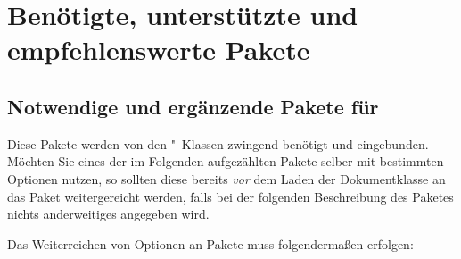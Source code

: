 \chapter{%
  Benötigte, unterstützte und empfehlenswerte Pakete%
  \label{sec:packages}%
}
\section{%
  Notwendige und ergänzende Pakete für \TUDScript%
  \label{sec:packages:needed}%
}

Diese Pakete werden von den \TUDScript"~Klassen zwingend benötigt und 
eingebunden. Möchten Sie eines der im Folgenden aufgezählten Pakete selber 
mit bestimmten Optionen nutzen, so sollten diese bereits \emph{vor} dem Laden 
der Dokumentklasse an das Paket weitergereicht werden, falls bei der folgenden
Beschreibung des Paketes nichts anderweitiges angegeben wird.
%
\begin{Example}
Das Weiterreichen von Optionen an Pakete muss folgendermaßen erfolgen:
\end{Example}
%
